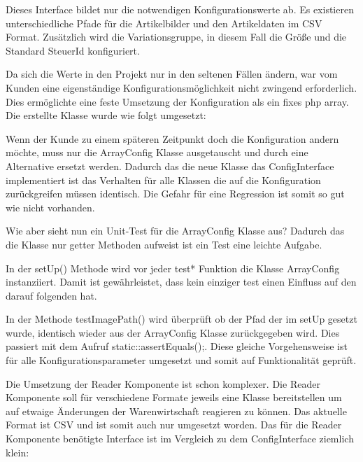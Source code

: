 

Dieses Interface bildet nur die notwendigen Konfigurationswerte ab. Es existieren unterschiedliche Pfade für die Artikelbilder und den Artikeldaten im CSV Format. Zusätzlich wird die Variationsgruppe, in diesem Fall die Größe und die Standard SteuerId konfiguriert.

Da sich die Werte in den Projekt nur in den seltenen Fällen ändern, war vom Kunden eine eigenständige Konfigurationsmöglichkeit nicht zwingend erforderlich. Dies ermöglichte eine feste Umsetzung der Konfiguration als ein fixes php array. Die erstellte Klasse wurde wie folgt umgesetzt:



Wenn der Kunde zu einem späteren Zeitpunkt doch die Konfiguration andern möchte, muss nur die ArrayConfig Klasse ausgetauscht und durch eine Alternative ersetzt werden. Dadurch das die neue Klasse das ConfigInterface implementiert ist das Verhalten für alle Klassen die auf die Konfiguration zurückgreifen müssen identisch. Die Gefahr für eine Regression ist somit so gut wie nicht vorhanden.

Wie aber sieht nun ein Unit-Test für die ArrayConfig Klasse aus? Dadurch das die Klasse nur getter Methoden aufweist ist ein Test eine leichte Aufgabe. 



In der setUp() Methode wird vor jeder test* Funktion die Klasse ArrayConfig instanziiert. Damit ist gewährleistet, dass kein einziger test einen Einfluss auf den darauf folgenden hat.

In der Methode testImagePath() wird überprüft ob der Pfad der im setUp gesetzt wurde, identisch wieder aus der ArrayConfig Klasse zurückgegeben wird. Dies passiert mit dem Aufruf static::assertEquals();. Diese gleiche Vorgehensweise ist für alle Konfigurationsparameter umgesetzt und somit auf Funktionalität geprüft.

Die Umsetzung der Reader Komponente ist schon komplexer. Die Reader Komponente soll für verschiedene Formate jeweils eine Klasse bereitstellen um auf etwaige Änderungen der Warenwirtschaft reagieren zu können. Das aktuelle Format ist CSV und ist somit auch nur umgesetzt worden. Das für die Reader Komponente benötigte Interface ist im Vergleich zu dem ConfigInterface ziemlich klein:

